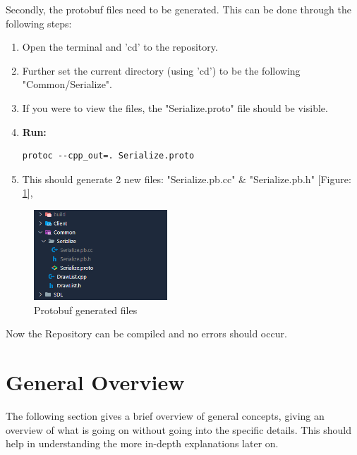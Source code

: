 \documentclass[12pt, a4paper]{report}
\begin{document}
Secondly, the protobuf files need to be generated. This can be done through the following steps:
\begin{enumerate}
    \item Open the terminal and 'cd' to the repository.
    \item Further set the current directory (using 'cd') to be the following "Common/Serialize".
    \item If you were to view the files, the "Serialize.proto" file should be visible.
    \item \textbf{Run:} \begin{verbatim}protoc --cpp_out=. Serialize.proto\end{verbatim}
    \item This should generate 2 new files: "Serialize.pb.cc" \& "Serialize.pb.h" [Figure: \ref{protobuf}],
\end{enumerate}

\begin{figure}[!htp]
    \centering
    \includegraphics[width=5cm]{Protobuf.png}
    \caption{Protobuf generated files}
    \label{protobuf}
\end{figure}

Now the Repository can be compiled and no errors should occur.
\chapter{General Overview}
The following section gives a brief overview of general concepts, giving an overview of what is going on without going into the specific details. This should help in understanding the more in-depth explanations later on.
\end{document}

